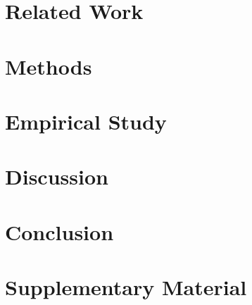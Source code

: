 \documentclass[11pt,a4paper]{article}
\begin{document}
\section{Related Work}
\label{sec:related}


\section{Methods}
\label{sec:methods}


\section{Empirical Study}
\label{sec:results}


\section{Discussion}
\label{sec:discussion}


\section{Conclusion}
\label{sec:conclusion}





\appendix
\section{Supplementary Material}
\label{sec:supplemental}

\end{document}
